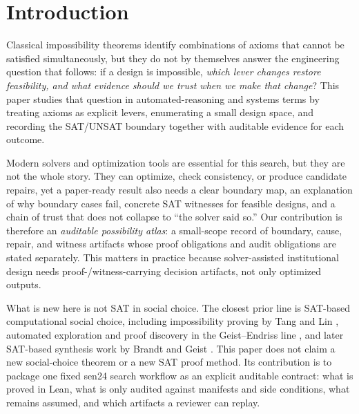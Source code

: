 \section{Introduction}

Classical impossibility theorems identify combinations of axioms that cannot be satisfied simultaneously, but they do not by themselves answer the engineering question that follows: if a design is impossible, \emph{which lever changes restore feasibility, and what evidence should we trust when we make that change}?
This paper studies that question in automated-reasoning and systems terms by treating axioms as explicit levers, enumerating a small design space, and recording the SAT/UNSAT boundary together with auditable evidence for each outcome.

Modern solvers and optimization tools are essential for this search, but they are not the whole story.
They can optimize, check consistency, or produce candidate repairs, yet a paper-ready result also needs a clear boundary map, an explanation of why boundary cases fail, concrete SAT witnesses for feasible designs, and a chain of trust that does not collapse to ``the solver said so.''
Our contribution is therefore an \emph{auditable possibility atlas}: a small-scope record of boundary, cause, repair, and witness artifacts whose proof obligations and audit obligations are stated separately.
This matters in practice because solver-assisted institutional design needs proof-/witness-carrying decision artifacts, not only optimized outputs.

What is new here is not SAT in social choice.
The closest prior line is SAT-based computational social choice, including impossibility proving by Tang and Lin \citep{tanglin2009computer}, automated exploration and proof discovery in the Geist--Endriss line \citep{geist2011automated}, and later SAT-based synthesis work by Brandt and Geist \citep{brandtgeist2016strategyproof}.
This paper does not claim a new social-choice theorem or a new SAT proof method.
Its contribution is to package one fixed sen24 search workflow as an explicit auditable contract: what is proved in Lean, what is only audited against manifests and side conditions, what remains assumed, and which artifacts a reviewer can replay.

